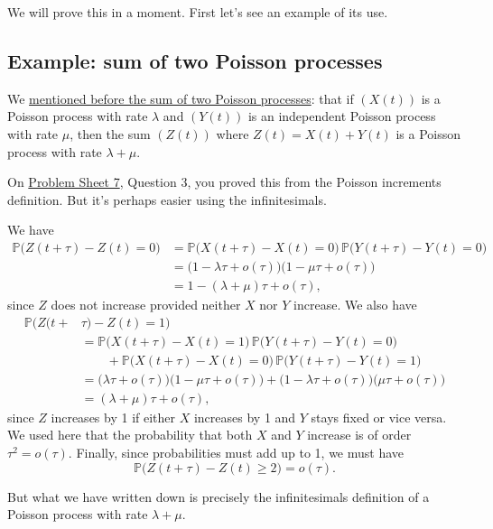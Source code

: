 \documentclass[
  a4paper,
]{article}
\theoremstyle{definition}
\theoremstyle{definition}
\theoremstyle{definition}
\theoremstyle{remark}
\begin{document}
We will prove this in a moment. First let's see an example of its use.

\hypertarget{sum2}{%
\subsection{Example: sum of two Poisson processes}\label{sum2}}

We \protect\hyperlink{summed-marked}{mentioned before the sum of two Poisson processes}: that if \((X(t))\) is a Poisson process with rate \(\lambda\) and \((Y(t))\) is an independent Poisson process with rate \(\mu\), then the sum \((Z(t))\) where \(Z(t) = X(t) + Y(t)\) is a Poisson process with rate \(\lambda + \mu\).

On \protect\hyperlink{P07}{Problem Sheet 7}, Question 3, you proved this from the Poisson increments definition. But it's perhaps easier using the infinitesimals.

We have
\begin{align*}\mathbb P\big( Z(t+\tau) - Z(t) = 0 \big) &= \mathbb P\big( X(t+\tau) - X(t) = 0 \big) \, \mathbb P\big( Y(t+\tau) - Y(t) = 0 \big) \\ &=\big(1 - \lambda \tau + o(\tau) \big)\big(1 - \mu \tau + o(\tau) \big) \\
&= 1 - (\lambda + \mu)\tau + o(\tau) , \end{align*}
since \(Z\) does not increase provided neither \(X\) nor \(Y\) increase. We also have
\begin{align*}\mathbb P\big( Z(t+{}&\tau) - Z(t) = 1 \big) \\
&= \mathbb P\big( X(t+\tau) - X(t) = 1 \big) \, \mathbb P\big( Y(t+\tau) - Y(t) = 0 \big) \\ &\qquad {}+ \mathbb P\big( X(t+\tau) - X(t) = 0 \big) \, \mathbb P\big( Y(t+\tau) - Y(t) = 1 \big) \\
&= \big(\lambda \tau + o(\tau) \big)\big(1 - \mu \tau + o(\tau) \big) + \big(1 - \lambda \tau + o(\tau) \big)\big(\mu \tau + o(\tau) \big) \\
&= (\lambda + \mu)\tau + o(\tau) , \end{align*}
since \(Z\) increases by 1 if either \(X\) increases by 1 and \(Y\) stays fixed or vice versa. We used here that the probability that both \(X\) and \(Y\) increase is of order \(\tau^2 = o(\tau)\). Finally, since probabilities must add up to 1, we must have
\[ \mathbb P\big( Z(t+\tau) - Z(t) \geq 2 \big) =  o(\tau) . \]

But what we have written down is precisely the infinitesimals definition of a Poisson process with rate \(\lambda + \mu\).
\end{document}
